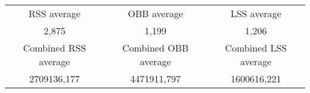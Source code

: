 \begin{tabular}{c|c|c}\\ 
RSS average & OBB average & LSS average\\ 
2,875 & 1,199 & 1,206\\ 
\hline 
Combined RSS average & Combined OBB average & Combined LSS average\\ 
2709136,177 & 4471911,797 & 1600616,221\\ 
\end{tabular}
